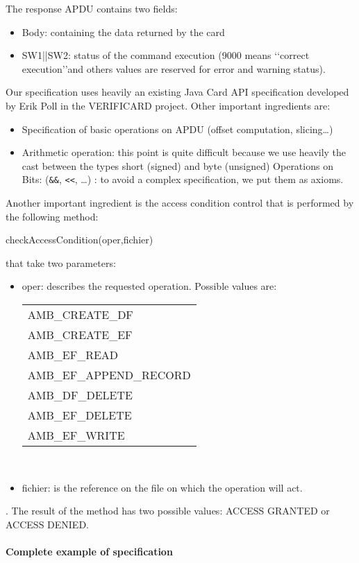 The response APDU contains two fields:
\begin{itemize} 
\item Body: containing the data returned by the card
\item SW1||SW2: status of the command execution (9000 means \lq\lq correct
execution\rq\rq  and others values are reserved for error and warning
status).

\end{itemize}
Our specification uses heavily an existing Java Card API specification
developed by Erik Poll in the VERIFICARD project. Other important
ingredients are: 
\begin{itemize}
\item Specification of basic operations on APDU (offset
computation, slicing\ldots) 
\item Arithmetic operation: this point is quite difficult because we
  use heavily the cast between the types short (signed) and byte
  (unsigned) Operations on Bits: ({\tt \&\&}, {\tt <<}, \ldots) : to
  avoid a complex specification, we put them as axioms.
\end{itemize}
Another important ingredient is the access condition control
that is performed by the following method:

 checkAccessCondition(oper,fichier)

that take two parameters:
\begin{itemize}
\item
oper: describes the requested operation. Possible values are:
\\
\begin{tabular}{l}
AMB\_CREATE\_DF \\
AMB\_CREATE\_EF \\
AMB\_EF\_READ  \\
AMB\_EF\_APPEND\_RECORD \\
AMB\_DF\_DELETE  \\
AMB\_EF\_DELETE \\
AMB\_EF\_WRITE 
\end{tabular}\\
\item fichier: is the reference on the file on which the operation will act. 
\end{itemize}.
The result of the method has two possible values:  ACCESS GRANTED 
or ACCESS DENIED.

\paragraph{Complete example of specification}

